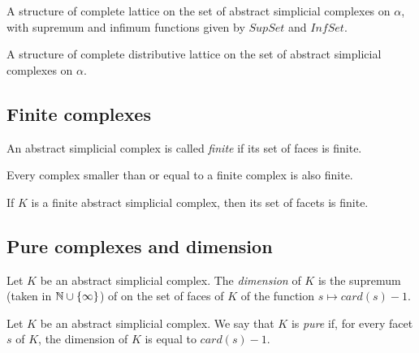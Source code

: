\begin{subdefi}[CompleteLattice]
A structure of complete lattice on the set of abstract simplicial complexes on $\alpha$, with supremum and infimum functions given by $SupSet$ and $InfSet$.

\end{subdefi}

\begin{subdefi}[CompleteDistribLattice]
A structure of complete distributive lattice on the set of abstract simplicial complexes on $\alpha$.

\end{subdefi}


\subsection{Finite complexes}

\begin{subdefi}[FiniteComplex]
An abstract simplicial complex is called \emph{finite} if its set of faces is finite.

\end{subdefi}

\begin{sublemma}
Every complex smaller than or equal to a finite complex is also finite.

\end{sublemma}

\begin{sublemma}
If $K$ is a finite abstract simplicial complex, then its set of facets is finite.

\end{sublemma}


\subsection{Pure complexes and dimension}

\begin{subdefi}[dimension]
Let $K$ be an abstract simplicial complex. The \emph{dimension} of $K$ is the supremum (taken in $\mathbb{N}\cup\{\infty\}$) of on the set of faces of $K$ of the function
$s\mapsto card(s)-1$.

\end{subdefi}

\begin{subdefi}[Pure]
Let $K$ be an abstract simplicial complex. We say that $K$ is \emph{pure} if, for every facet $s$ of $K$, the dimension of $K$ is equal to $card(s) -1$.

\end{subdefi}


